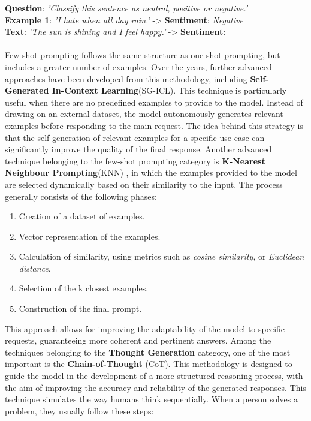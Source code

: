 \textbf{Question}: \textit{'Classify this sentence as neutral, positive or negative.'} \\
\textbf{Example 1}: \textit{'I hate when all day rain.'} -> \textbf{Sentiment}: \textit{Negative}\\
\textbf{Text}: \textit{'The sun is shining and I feel happy.'} -> \textbf{Sentiment}: \\
\\
Few-shot prompting follows the same structure as one-shot prompting, but includes a greater number of examples. Over the years, further advanced approaches have been developed from this methodology, including \textbf{Self-Generated In-Context Learning}(SG-ICL)\cite{kim2022selfgeneratedincontextlearningleveraging}.
This technique is particularly useful when there are no predefined examples to provide to the model. Instead of drawing on an external dataset, the model autonomously generates relevant examples before responding to the main request. The idea behind this strategy is that the self-generation of relevant examples for a specific use case can significantly improve the quality of the final response.
Another advanced technique belonging to the few-shot prompting category is \textbf{K-Nearest Neighbour Prompting}(KNN) \cite{xu2023knnpromptingbeyondcontextlearning}, in which the examples provided to the model are selected dynamically based on their similarity to the input. The process generally consists of the following phases:\\
\begin{enumerate}
    \item Creation of a dataset of examples.
    \item Vector representation of the examples.
    \item Calculation of similarity, using metrics such as \textit{cosine similarity}, or \textit{Euclidean distance}.
    \item Selection of the k closest examples.
    \item Construction of the final prompt.
\end{enumerate}
This approach allows for improving the adaptability of the model to specific requests, guaranteeing more coherent and pertinent answers.
Among the techniques belonging to the \textbf{Thought Generation} category, one of the most important is the \textbf{Chain-of-Thought} (CoT)\cite{Cot}.
This methodology is designed to guide the model in the development of a more structured reasoning process, with the aim of improving the accuracy and reliability of the generated responses. This technique simulates the way humans think sequentially. When a person solves a problem, they usually follow these steps:\\
